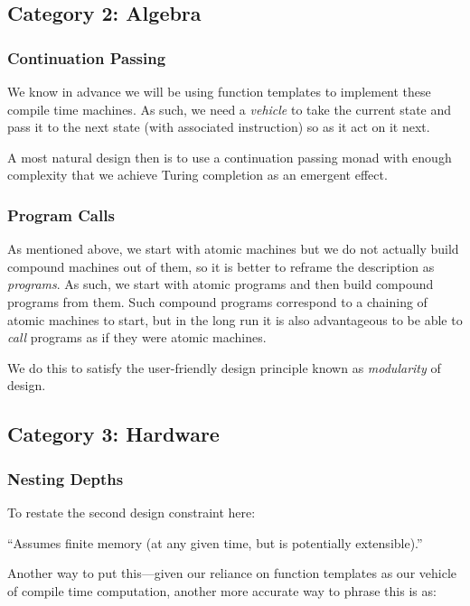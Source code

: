\documentclass[twoside]{article}
\begin{document}
\subsection*{Category 2: Algebra}

\subsubsection*{Continuation Passing}

We know in advance we will be using function templates to implement these compile time machines.
As such, we need a \emph{vehicle} to take the current state and pass it to the next state
(with associated instruction) so as it act on it next.

A most natural design then is to use a continuation passing monad with enough complexity that we achieve Turing
completion as an emergent effect.

\subsubsection*{Program Calls}

As mentioned above, we start with atomic machines but we do not actually build compound machines out of them,
so it is better to reframe the description as \emph{programs}. As such, we start with atomic programs and then
build compound programs from them. Such compound programs correspond to a chaining of atomic machines to start,
but in the long run it is also advantageous to be able to \emph{call} programs as if they were atomic machines.

We do this to satisfy the user-friendly design principle known as \emph{modularity} of design.

\subsection*{Category 3: Hardware}

\subsubsection*{Nesting Depths}

To restate the second design constraint here:

\begin{center}
``Assumes finite memory (at any given time, but is potentially extensible).''
\end{center}

Another way to put this---given our reliance on function templates as our vehicle of compile time computation,
another more accurate way to phrase this is as:
\end{document}
